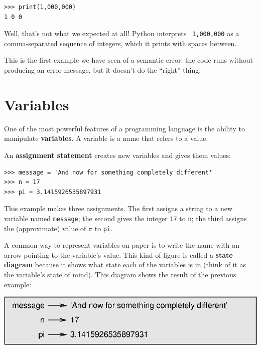 \documentclass[10pt]{book}
\begin{document}
\beforeverb
\begin{verbatim}
>>> print(1,000,000)
1 0 0
\end{verbatim}
\afterverb
%
Well, that's not what we expected at all!  Python interprets {\tt
  1,000,000} as a comma-separated sequence of integers, which it
prints with spaces between.


This is the first example we have seen of a semantic error: the code
runs without producing an error message, but it doesn't do the
``right'' thing.


\section{Variables}

One of the most powerful features of a programming language is the
ability to manipulate {\bf variables}.  A variable is a name that
refers to a value.

An {\bf assignment statement} creates new variables and gives
them values:

\beforeverb
\begin{verbatim}
>>> message = 'And now for something completely different'
>>> n = 17
>>> pi = 3.1415926535897931
\end{verbatim}
\afterverb
%
This example makes three assignments.  The first assigns a string
to a new variable named {\tt message};
the second gives the integer {\tt 17} to {\tt n}; the third
assigns the (approximate) value of $\pi$ to {\tt pi}.


A common way to represent variables on paper is to write the name with
an arrow pointing to the variable's value.  This kind of figure is
called a {\bf state diagram} because it shows what state each of the
variables is in (think of it as the variable's state of mind).
This diagram shows the result of the previous example:

\beforefig
\centerline{\includegraphics{figs/state2.eps}}
\afterfig
\end{document}
